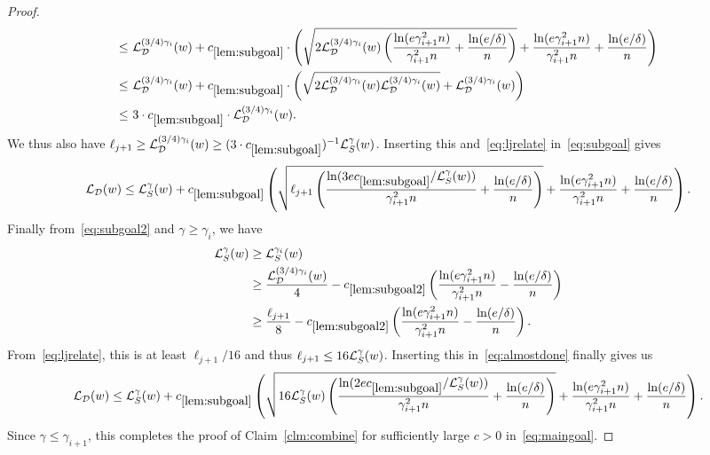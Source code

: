 \begin{proof}
\begin{align*}
    \leq \ & \mathcal{L}^{(3/4)\gamma_{i}}_{\mathcal{D}}(w) + c_{\ref{lem:subgoal}} \cdot \left(\sqrt{2 \mathcal{L}^{(3/4)\gamma_{i}}_{\mathcal{D}}(w)\left( \frac{ \ln(e\gamma_{i+1}^2 n)}{\gamma_{i+1}^2 n} + \frac{\ln(e/\delta)}{n} \right)} + \frac{\ln(e \gamma_{i+1}^2 n)}{\gamma_{i+1}^2 n} + \frac{\ln(e/\delta)}{n} \right)\\
    \leq \ & \mathcal{L}^{(3/4)\gamma_{i}}_{\mathcal{D}}(w) + c_{\ref{lem:subgoal}} \cdot \left(\sqrt{2 \mathcal{L}^{(3/4)\gamma_{i}}_{\mathcal{D}}(w)\mathcal{L}^{(3/4)\gamma_{i}}_{\mathcal{D}}(w)} + \mathcal{L}^{(3/4)\gamma_{i}}_{\mathcal{D}}(w) \right)\\
    \leq \ & 3\cdot c_{\ref{lem:subgoal}} \cdot \mathcal{L}^{(3/4)\gamma_{i}}_{\mathcal{D}}(w).
\end{align*}
We thus also have $\ell_{j+1} \geq \mathcal{L}^{(3/4)\gamma_{i}}_{\mathcal{D}}(w) \geq (3\cdot c_{\ref{lem:subgoal}})^{-1} \mathcal{L}_S^\gamma(w)$. Inserting this and~\eqref{eq:ljrelate} in~\eqref{eq:subgoal} gives
\begin{align}
\mathcal{L}_{\mathcal{D}}(w) \leq \mathcal{L}_{S}^\gamma(w) + c_{\ref{lem:subgoal}} \left( \sqrt{\ell_{j+1}\left( \frac{ \ln(3e c_{\ref{lem:subgoal}}/\mathcal{L}_{S}^\gamma(w))}{\gamma_{i+1}^2 n} + \frac{\ln(e/\delta)}{n} \right)} + \frac{\ln(e\gamma_{i+1}^2 n)}{\gamma_{i+1}^2 n} + \frac{\ln(e/\delta)}{n} \right).\label{eq:almostdone}
\end{align}
Finally from~\eqref{eq:subgoal2} and $\gamma \geq \gamma_i$, we have
\begin{align*}
\mathcal{L}_{S}^\gamma(w) &\geq \mathcal{L}_{S}^{\gamma_i}(w) \\
&\geq \frac{\mathcal{L}_{\mathcal{D}}^{(3/4)\gamma_i}(w)}{4} - c_{\ref{lem:subgoal2}}\left( \frac{\ln(e\gamma_{i+1}^2 n)}{\gamma_{i+1}^2 n} - \frac{\ln(e/\delta)}{n}\right)\\
&\geq \frac{\ell_{j+1}}{8} - c_{\ref{lem:subgoal2}}\left( \frac{\ln(e\gamma_{i+1}^2 n)}{\gamma_{i+1}^2 n} - \frac{\ln(e/\delta)}{n}\right).
\end{align*}
From~\eqref{eq:ljrelate}, this is at least $\ell_{j+1}/16$ and thus $\ell_{j+1} \leq 16 \mathcal{L}^{\gamma}_S(w)$. Inserting this in~\eqref{eq:almostdone} finally gives us
\begin{align*}
\mathcal{L}_{\mathcal{D}}(w) \leq \mathcal{L}_{S}^\gamma(w) + c_{\ref{lem:subgoal}} \left( \sqrt{16 \mathcal{L}^\gamma_S(w) \left( \frac{ \ln(2e c_{\ref{lem:subgoal}}/\mathcal{L}_{S}^\gamma(w))}{\gamma_{i+1}^2 n} + \frac{\ln(e/\delta)}{n} \right)} + \frac{\ln(e\gamma_{i+1}^2 n)}{\gamma_{i+1}^2 n} + \frac{\ln(e/\delta)}{n} \right).
\end{align*}
Since $\gamma \leq \gamma_{i+1}$, this completes the proof of Claim~\ref{clm:combine} for sufficiently large $c>0$ in~\eqref{eq:maingoal}.
\end{proof}

